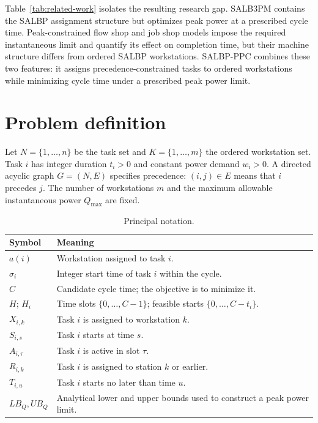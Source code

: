 \documentclass[]{interact}
\theoremstyle{plain}
\theoremstyle{definition}
\theoremstyle{remark}
\newcommand{\Problem}{SALBP-PPC}
\newcommand{\Qmax}{Q_{\max}}
\begin{document}
Table~\ref{tab:related-work} isolates the resulting research gap. SALB3PM contains the SALBP assignment structure but optimizes peak power at a prescribed cycle time. Peak-constrained flow shop and job shop models impose the required instantaneous limit and quantify its effect on completion time, but their machine structure differs from ordered SALBP workstations. \Problem{} combines these two features: it assigns precedence-constrained tasks to ordered workstations while minimizing cycle time under a prescribed peak power limit.

\section{Problem definition}
\label{sec:problem}

Let $N=\{1,\ldots,n\}$ be the task set and $K=\{1,\ldots,m\}$ the ordered workstation set. Task $i$ has integer duration $t_i>0$ and constant power demand $w_i>0$. A directed acyclic graph $G=(N,E)$ specifies precedence: $(i,j)\in E$ means that $i$ precedes $j$. The number of workstations $m$ and the maximum allowable instantaneous power $\Qmax$ are fixed.

\begin{table}[t!]
\centering
\caption{Principal notation.}
\label{tab:notation}
\small
\renewcommand{\arraystretch}{1.15}
\begin{tabularx}{\textwidth}{@{} l Y @{}}
\toprule
Symbol & Meaning \\
\midrule
$a(i)$ & Workstation assigned to task $i$. \\
$\sigma_i$ & Integer start time of task $i$ within the cycle. \\
$C$ & Candidate cycle time; the objective is to minimize it. \\
$H$; $H_i$ & Time slots $\{0,\ldots,C-1\}$; feasible starts $\{0,\ldots,C-t_i\}$. \\
$X_{i,k}$ & Task $i$ is assigned to workstation $k$. \\
$S_{i,s}$ & Task $i$ starts at time $s$. \\
$A_{i,\tau}$ & Task $i$ is active in slot $\tau$. \\
$R_{i,k}$ & Task $i$ is assigned to station $k$ or earlier. \\
$T_{i,u}$ & Task $i$ starts no later than time $u$. \\
$LB_Q,UB_Q$ & Analytical lower and upper bounds used to construct a peak power limit. \\
\bottomrule
\end{tabularx}
\end{table}
\end{document}

